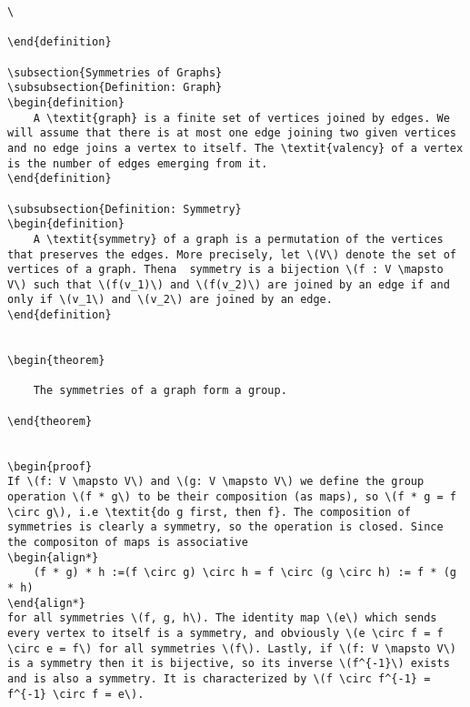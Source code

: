 \documentclass{article}
\theoremstyle{plain}
\newtheorem{theorem}{Theorem}
\newtheorem{definition}{Definition}
\begin{document}
\begin{verbatim}
\

\end{definition}

\subsection{Symmetries of Graphs}
\subsubsection{Definition: Graph}
\begin{definition}
    A \textit{graph} is a finite set of vertices joined by edges. We will assume that there is at most one edge joining two given vertices and no edge joins a vertex to itself. The \textit{valency} of a vertex is the number of edges emerging from it.
\end{definition}

\subsubsection{Definition: Symmetry}
\begin{definition}
    A \textit{symmetry} of a graph is a permutation of the vertices that preserves the edges. More precisely, let \(V\) denote the set of vertices of a graph. Thena  symmetry is a bijection \(f : V \mapsto V\) such that \(f(v_1)\) and \(f(v_2)\) are joined by an edge if and only if \(v_1\) and \(v_2\) are joined by an edge.
\end{definition}


\begin{theorem}

    The symmetries of a graph form a group.

\end{theorem}


\begin{proof}
If \(f: V \mapsto V\) and \(g: V \mapsto V\) we define the group operation \(f * g\) to be their composition (as maps), so \(f * g = f \circ g\), i.e \textit{do g first, then f}. The composition of symmetries is clearly a symmetry, so the operation is closed. Since the compositon of maps is associative
\begin{align*}
    (f * g) * h :=(f \circ g) \circ h = f \circ (g \circ h) := f * (g * h)
\end{align*}
for all symmetries \(f, g, h\). The identity map \(e\) which sends every vertex to itself is a symmetry, and obviously \(e \circ f = f \circ e = f\) for all symmetries \(f\). Lastly, if \(f: V \mapsto V\) is a symmetry then it is bijective, so its inverse \(f^{-1}\) exists and is also a symmetry. It is characterized by \(f \circ f^{-1} = f^{-1} \circ f = e\).


\end{verbatim}
\end{document}
